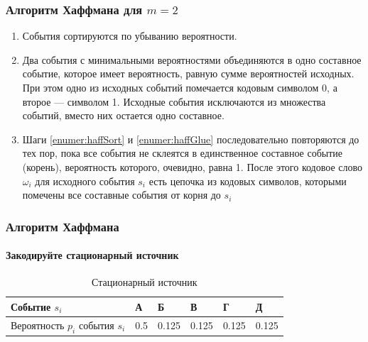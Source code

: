 \begin{frame}
\frametitle{Алгоритм Хаффмана для $m=2$}
\begin{enumerate}
    \item\label{enumer:haffSort} События сортируются по убыванию вероятности.
    
    \item\label{enumer:haffGlue} Два события с минимальными вероятностями объединяются в одно составное событие, которое имеет вероятность, равную сумме вероятностей исходных. При этом одно из исходных событий помечается кодовым символом 0, а второе --- символом 1. Исходные события исключаются из множества событий, вместо них остается одно составное. 
    
    \item Шаги \ref{enumer:haffSort} и \ref{enumer:haffGlue} последовательно повторяются до тех пор, пока все события не склеятся в единственное составное событие (корень), вероятность которого, очевидно, равна 1. После этого кодовое слово $\omega_i$ для исходного события $s_i$ есть цепочка из кодовых символов, которыми помечены все составные события от корня до $s_i$ 

\end{enumerate}
\end{frame}


\begin{frame}
\frametitle{Алгоритм Хаффмана}
\framesubtitle{Закодируйте стационарный источник}
\begin{example}
    \begin{table}[ht]
    \caption{Стационарный источник}
    \label{t:haffStatSource}
    \centering
    \begin{tabular}[c]{|l|l|l|l|l|l|}
        \hline
        Событие $s_i$                       &А      &Б      &В      &Г     &Д     \\ \hline
        Вероятность $p_i$ события $s_i$     &0.5    &0.125  &0.125  &0.125 &0.125 \\ \hline
    \end{tabular}
    \end{table}
\end{example}
\end{frame}


